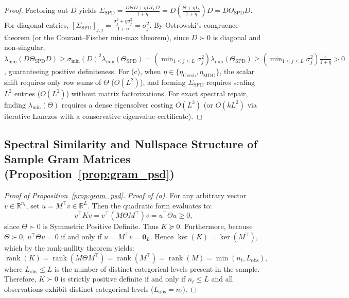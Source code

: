\documentclass[default,sn-mathphys,Numbered]{sn-jnl}
\theoremstyle{thmstyleone}
\theoremstyle{thmstylethree}
\theoremstyle{thmstyletwo}
\newcommand{\rank}{\operatorname{rank}}
\begin{document}
\begin{appendices}
\begin{proof}
Factoring out $D$ yields $\Sigma_{\mathrm{SPD}} = \frac{D \Theta D + \eta D I_L D}{1+\eta} = D \left( \frac{\Theta + \eta I_L}{1+\eta} \right) D = D \Theta_{\mathrm{SPD}} D$.
For diagonal entries, $[\Sigma_{\mathrm{SPD}}]_{j, j} = \frac{\sigma_j^2 + \eta \sigma_j^2}{1+\eta} = \sigma_j^2$.
By Ostrowski's congruence theorem (or the Courant--Fischer min-max theorem), since $D \succ 0$ is diagonal and non-singular, $\lambda_{\min}(D \Theta_{\mathrm{SPD}} D) \ge \sigma_{\min}(D)^2 \lambda_{\min}(\Theta_{\mathrm{SPD}}) = (\min_{1 \le j \le L} \sigma_j^2) \lambda_{\min}(\Theta_{\mathrm{SPD}}) \ge (\min_{1 \le j \le L} \sigma_j^2) \frac{\varepsilon}{1+\eta} > 0$, guaranteeing positive definiteness. For (c), when $\eta \in \{\eta_{\mathrm{Gersh}}, \eta_{\mathrm{MDG}}\}$, the scalar shift requires only row sums of $\Theta$ ($O(L^2)$), and forming $\Sigma_{\mathrm{SPD}}$ requires scaling $L^2$ entries ($O(L^2)$) without matrix factorizations. For exact spectral repair, finding $\lambda_{\min}(\Theta)$ requires a dense eigensolver costing $O(L^3)$  (or $O(k L^2)$  via iterative Lanczos with a conservative eigenvalue certificate).
\end{proof}


\subsection{Spectral Similarity and Nullspace Structure of Sample Gram Matrices (Proposition~\ref{prop:gram_psd})}
\label{subsec:proof_gram}

\begin{proof}[Proof of Proposition~\ref{prop:gram_psd}]
\textit{Proof of (a).} For any arbitrary vector $v \in \mathbb{R}^{n_t}$, set $u = M^\top v \in \mathbb{R}^L$. Then the quadratic form evaluates to:
\begin{equation}
v^\top K v = v^\top (M \Theta M^\top) v = u^\top \Theta u \ge 0,
\end{equation}
since $\Theta \succ 0$ is Symmetric Positive Definite. Thus $K \succeq 0$. Furthermore, because $\Theta \succ 0$, $u^\top \Theta u = 0$ if and only if $u = M^\top v = \bm{0}_L$. Hence $\ker(K) = \ker(M^\top)$, which by the rank-nullity theorem yields:
\begin{equation}
\rank(K) = \rank(M \Theta M^\top) = \rank(M^\top) = \rank(M) = \min(n_t, L_{\mathrm{obs}}),
\end{equation}
where $L_{\mathrm{obs}} \le L$ is the number of distinct categorical levels present in the sample. Therefore, $K \succ 0$ is strictly positive definite if and only if $n_t \le L$ and all observations exhibit distinct categorical levels ($L_{\mathrm{obs}} = n_t$).


\end{proof}
\end{appendices}
\end{document}
